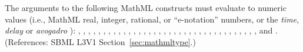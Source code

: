 The arguments to the following MathML constructs must evaluate to 
numeric values (i.e., MathML real, integer, rational, or ``e-notation'' numbers,
or the \emph{time}, \emph{delay} or \emph{avogadro} ):
, , , ,
, , , ,
, , , ,
, , , , ,
, , , , ,
, , , , ,
, , , , ,
, , , , and .
(References: SBML L3V1 Section~\ref{sec:mathmltype}.)
